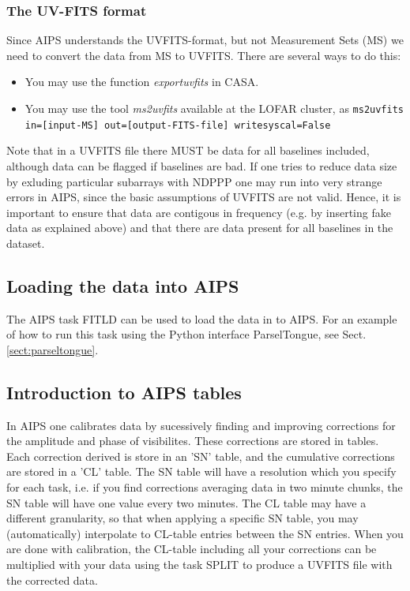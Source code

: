 \subsubsection{The UV-FITS format}
Since AIPS understands the UVFITS-format, but not Measurement Sets (MS)
we need to convert the data from MS to UVFITS. There are several ways to do this:
\begin{itemize}
\item You may use the function \emph{exportuvfits} in CASA.
\item You may use the tool \emph{ms2uvfits} available at the LOFAR cluster, as {\tt ms2uvfits in=[input-MS] out=[output-FITS-file] writesyscal=False}
\end{itemize}
Note that in a UVFITS file there MUST be data for all baselines included, although
data can be flagged if baselines are bad. If one tries to reduce data size by exluding particular subarrays
with NDPPP one may run into very strange errors in AIPS, since the basic assumptions of UVFITS are not valid.
Hence, it is important to ensure that data are contigous in frequency (e.g. by inserting fake data as explained above)
and that there are data present for all baselines in the dataset. 

\subsection{Loading the data into AIPS}
The AIPS task FITLD can be used to load the data in to AIPS. For an example
of how to run this task using the Python interface ParselTongue, see Sect. \ref{sect:parseltongue}.

\subsection{Introduction to AIPS tables}
In AIPS one calibrates data by sucessively finding and improving corrections for the 
amplitude and phase of visibilites. These corrections are stored in tables.
Each correction derived is store in an 'SN' table, and the cumulative corrections
are stored in a 'CL' table. The SN table will have a resolution which you specify for each
task, i.e. if you find corrections averaging data in two minute chunks,
the SN table will have one value every two minutes. The CL table may have a different granularity,
so that when applying a specific SN table, you may (automatically) interpolate to 
CL-table entries between the SN entries. When you are done with calibration, the CL-table
including all your corrections can be multiplied with your data using the task SPLIT to produce
a UVFITS file with the corrected data.

